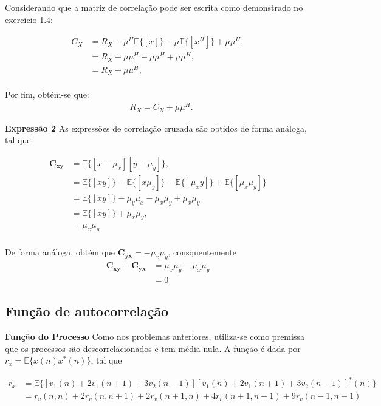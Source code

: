 Considerando que a matriz de correlação pode ser escrita como demonstrado no exercício 1.4:

\begin{align*}
    C_{X} &= R_{X} - \mu^{H}\mathbb{E}\{[x]\} - \mu \mathbb{E}\{[x^{H}]\} + \mu \mu^{H}, \\
    &= R_{X} - \mu \mu^{H} - \mu \mu^{H} + \mu \mu^{H}, \\
    &= R_{X} - \mu \mu^{H}, \\
\end{align*}    

Por fim, obtém-se que:
\begin{align*}
    &R_{X} = C_{X} + \mu \mu^{H}.
\end{align*}

\textbf{Expressão 2}
As expressões de correlação cruzada são obtidos de forma análoga, tal que:


\begin{align}
    \mathbf{C_{xy}} &= \mathbb{E}\{[x - \mu_{x}][y - \mu_{y}]\}, \\
    &= \mathbb{E}\{[xy]\} - \mathbb{E}\{[x\mu_{y}]\} - \mathbb{E}\{[\mu_{x} y]\} + \mathbb{E}\{[\mu_{x} \mu_{y}]\} \\
    &= \mathbb{E}\{[xy]\} - \mu_{y} \mu_{x} - \mu_{x} \mu_{y} + \mu_{x} \mu_{y} \\
    &= \mathbb{E}\{[xy]\} + \mu_{x} \mu_{y}, \\
    &= \mu_{x} \mu_{y} \\
\end{align}

De forma análoga, obtém que $\mathbf{C_{yx}} = - \mu_{x} \mu_{y}$, consquentemente
\begin{align*}
    \mathbf{C_{xy}} + \mathbf{C_{yx}} &= \mu_{x} \mu_{y} - \mu_{x} \mu_{y} \\
    &= 0
\end{align*}


\subsection{Função de autocorrelação} %
\textbf{Função do Processo}
Como nos problemas anteriores, utiliza-se como premissa que os processos são descorrelacionados e tem média nula. A função é dada por $r_{x} = \mathbb{E}\{x(n) x^{*}(n)\}$, tal que

\begin{align*}
    r_{x} &= \mathbb{E}\{[v_{1}(n) + 2v_{1}(n+1) + 3v_{2}(n-1)] [v_{1}(n) + 2v_{1}(n+1) + 3v_{2}(n-1)]^{*}(n)\} \\
    &= r_{v}(n,n) + 2r_{v}(n,n+1) + 2r_{v}(n+1,n) + 4r_{v}(n+1,n+1) + 9r_{v}(n-1,n-1)
\end{align*}


